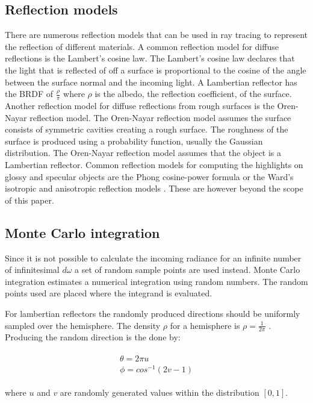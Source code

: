 \documentclass[twocolumn]{article}
\begin{document}
\subsection{Reflection models}
There are numerous reflection models that can be used in ray tracing to represent the reflection of different materials. A common reflection model for diffuse reflections is the Lambert's cosine law. The Lambert's cosine law declares that the light that is reflected of off a surface is proportional to the cosine of the angle between the surface normal and the incoming light. A Lambertian reflector has the BRDF of $\frac{\rho}{\pi}$ where $\rho$ is the albedo, the reflection coefficient, of the surface.
Another reflection model for diffuse reflections from rough surfaces is the Oren-Nayar reflection model. The Oren-Nayar reflection model assumes the surface consists of symmetric cavities creating a rough surface. The roughness of the surface is produced using a probability function, usually the Gaussian distribution. The Oren-Nayar reflection model assumes that the object is a Lambertian reflector.
Common reflection models for computing the highlights on glossy and specular objects are the Phong cosine-power formula or the Ward's isotropic and anisotropic reflection models \cite{hq}. These are however beyond the scope of this paper.

\subsection{Monte Carlo integration}
	Since it is not possible to calculate the incoming radiance for an infinite number of infinitesimal $d\omega$ a set of random sample points are used instead. Monte Carlo integration estimates a numerical integration using random numbers. The random points used are placed where the integrand is evaluated. 

For lambertian reflectors the randomly produced directions should be uniformly sampled over the hemisphere. The density $\rho$ for a hemisphere is $\rho = \frac{1}{2\pi}$ \cite{CG:PP}. Producing the random direction is the done by:


\begin{align*}
	\begin{split}
		\theta = 2\pi u \\
		\phi = cos^{-1}(2v - 1)
	\end{split}
\end{align*}

where $u$ and $v$ are randomly generated values within the distribution $[0, 1]$.
\end{document}
